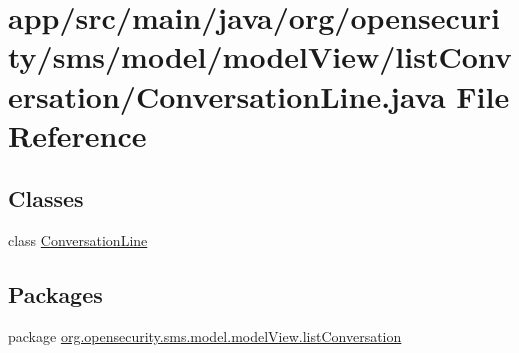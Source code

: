 \hypertarget{a00024}{\section{app/src/main/java/org/opensecurity/sms/model/model\+View/list\+Conversation/\+Conversation\+Line.java File Reference}
\label{a00024}
}
\subsection*{Classes}
\begin{DoxyCompactItemize}
\item 
class \hyperlink{a00008}{Conversation\+Line}
\end{DoxyCompactItemize}
\subsection*{Packages}
\begin{DoxyCompactItemize}
\item 
package \hyperlink{a00039}{org.\+opensecurity.\+sms.\+model.\+model\+View.\+list\+Conversation}
\end{DoxyCompactItemize}
